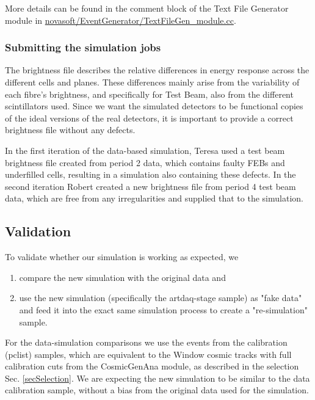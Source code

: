 More details can be found in the comment block of the Text File Generator module in \newline \href{https://github.com/novaexperiment/novasoft/blob/main/EventGenerator/TextFileGen\_module.cc}{novasoft/EventGenerator/TextFileGen\_module.cc}.

\subsubsection{Submitting the simulation jobs}\label{secGenerator}
The brightness file describes the relative differences in energy response across the different cells and planes. These differences mainly arise from the variability of each fibre's brightness, and specifically for Test Beam, also from the different scintillators used. Since we want the simulated detectors to be functional copies of the ideal versions of the real detectors, it is important to provide a correct brightness file without any defects.

In the first iteration of the data-based simulation, Teresa used a test beam brightness file created from period 2 data, which contains faulty FEBs and underfilled cells, resulting in a simulation also containing these defects. In the second iteration Robert created a new brightness file from period 4 test beam data, which are free from any irregularities and supplied that to the simulation.

\subsection{Validation}
To validate whether our simulation is working as expected, we
\begin{enumerate}
\item compare the new simulation with the original data and
\item use the new simulation (specifically the artdaq-stage sample) as "fake data" and feed it into the exact same simulation process to create a "re-simulation" sample.
\end{enumerate}

For the data-simulation comparisons we use the events from the calibration (pclist) samples, which are equivalent to the Window cosmic tracks with full calibration cuts from the CosmicGenAna module, as described in the selection Sec. \ref{secSelection}. We are expecting the new simulation to be similar to the data calibration sample, without a bias from the original data used for the simulation.

